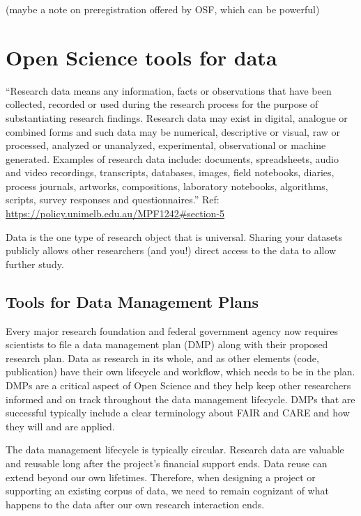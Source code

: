 \documentclass[
  letterpaper,
  DIV=11,
  numbers=noendperiod]{scrreport}
\begin{document}
(maybe a note on preregistration offered by OSF, which can be powerful)

\hypertarget{open-science-tools-for-data}{%
\section{Open Science tools for
data}\label{open-science-tools-for-data}}

``Research data means any information, facts or observations that have
been collected, recorded or used during the research process for the
purpose of substantiating research findings. Research data may exist in
digital, analogue or combined forms and such data may be numerical,
descriptive or visual, raw or processed, analyzed or unanalyzed,
experimental, observational or machine generated. Examples of research
data include: documents, spreadsheets, audio and video recordings,
transcripts, databases, images, field notebooks, diaries, process
journals, artworks, compositions, laboratory notebooks, algorithms,
scripts, survey responses and questionnaires.'' Ref:
\url{https://policy.unimelb.edu.au/MPF1242\#section-5}

Data is the one type of research object that is universal. Sharing your
datasets publicly allows other researchers (and you!) direct access to
the data to allow further study.

\hypertarget{tools-for-data-management-plans}{%
\subsection{Tools for Data Management
Plans}\label{tools-for-data-management-plans}}

Every major research foundation and federal government agency now
requires scientists to file a data management plan (DMP) along with
their proposed research plan. Data as research in its whole, and as
other elements (code, publication) have their own lifecycle and
workflow, which needs to be in the plan. DMPs are a critical aspect of
Open Science and they help keep other researchers informed and on track
throughout the data management lifecycle. DMPs that are successful
typically include a clear terminology about FAIR and CARE and how they
will and are applied.

The data management lifecycle is typically circular. Research data are
valuable and reusable long after the project's financial support ends.
Data reuse can extend beyond our own lifetimes. Therefore, when
designing a project or supporting an existing corpus of data, we need to
remain cognizant of what happens to the data after our own research
interaction ends.
\end{document}
